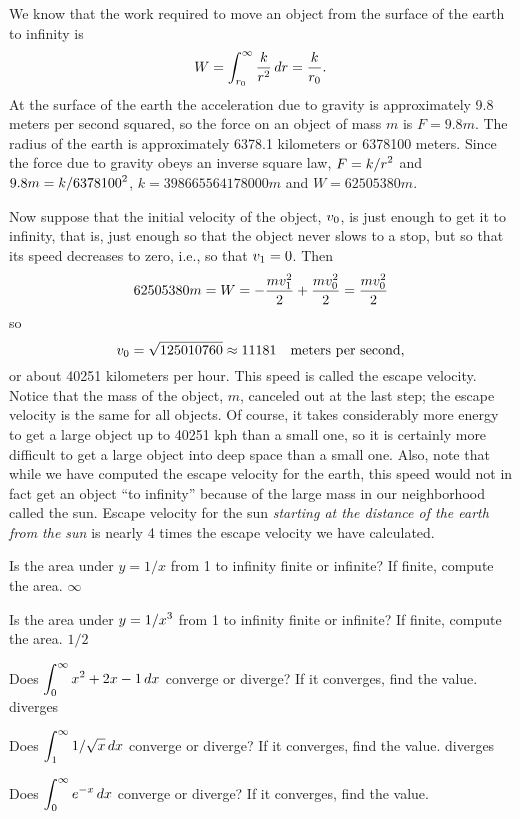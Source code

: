 We know that the work required to move an object from the surface
of the earth to infinity is
$$W=\int_{r_0}^\infty {k\over r^2}\,dr={k\over r_0}.$$ 
At the surface of the earth the acceleration due
to gravity is approximately 9.8 meters per second squared, so the
force on an object of mass $m$ is $F=9.8m$. The radius of the earth is
approximately 6378.1 kilometers or 6378100 meters. Since the force due
to gravity obeys an inverse square law, $\displaystyle F=k/r^2$ and
$\displaystyle 9.8m=k/6378100^2$, $k= 398665564178000m$ and
$W=62505380 m$.

Now suppose that the initial velocity of the object, $\displaystyle v_0$, is just
enough to get it to infinity, that is, just enough so that the object
never slows to a stop, but so that its speed decreases to zero, i.e., so
that $\displaystyle v_1=0$. Then 
$$62505380 m=W=-{mv_1^2\over2}+{mv_0^2\over2}={mv_0^2\over2}$$
so
$$v_0=\sqrt{125010760}\approx 11181\quad\hbox{meters per second},$$
or about 40251 kilometers per hour. This speed is called the {\dfont
escape velocity\/}. Notice that the mass of
the object, $m$, canceled out at the last step; the escape velocity
is the same for all objects. Of course, it takes considerably more
energy to get a large object up to 40251 kph than a small one, so it
is certainly more difficult to get a large object into deep space than
a small one. Also, note that while we have computed the escape
velocity for the earth, this speed would not in fact get an object
``to infinity'' because of the large mass in our neighborhood called
the sun. Escape velocity for the sun {\em starting at the distance of
the earth from the sun\/} is nearly 4 times the escape velocity we
have calculated.

\exercises

\exercise Is the area under $y=1/x$ from 1 to infinity finite or
infinite? If finite, compute the area.
\answer $\infty$
\endanswer
\endexercise

\exercise Is the area under $\displaystyle y=1/x^3$ from 1 to infinity finite or
infinite? If finite, compute the area.
\answer $1/2$
\endanswer
\endexercise

\exercise Does $\displaystyle\int_0^\infty x^2+2x-1\,dx$ converge or diverge? If
it converges, find the value.
\answer diverges 
\endanswer
\endexercise

\exercise Does $\displaystyle\int_1^\infty 1/\sqrt{x}\,dx$ converge or diverge? If
it converges, find the value.
\answer diverges
\endanswer

\endexercise

\exercise Does $\displaystyle\int_0^\infty e^{-x }\,dx$ converge or diverge? If
it converges, find the value.
\endanswer
\endexercise

